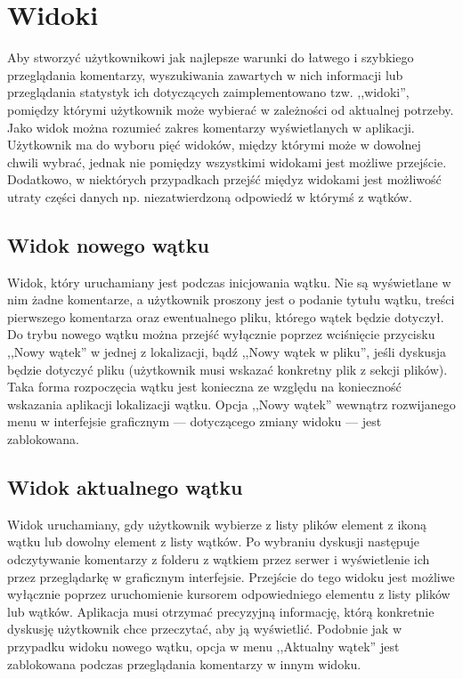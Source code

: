 \section{Widoki}

\label{views}

Aby stworzyć użytkownikowi jak najlepsze warunki do łatwego i szybkiego przeglądania komentarzy, wyszukiwania zawartych w nich informacji lub przeglądania statystyk ich dotyczących zaimplementowano tzw. ,,widoki'', pomiędzy którymi użytkownik może wybierać w zależności od aktualnej potrzeby. Jako widok można rozumieć zakres komentarzy wyświetlanych w aplikacji. Użytkownik ma do wyboru pięć widoków, między którymi może w dowolnej chwili wybrać, jednak nie pomiędzy wszystkimi widokami jest możliwe przejście. Dodatkowo, w niektórych przypadkach przejść międyz widokami jest możliwość utraty części danych np. niezatwierdzoną odpowiedź w którymś z wątków.

\subsection*{Widok nowego wątku}

Widok, który uruchamiany jest podczas inicjowania wątku. Nie są wyświetlane w nim żadne komentarze, a użytkownik proszony jest o podanie tytułu wątku, treści pierwszego komentarza oraz ewentualnego pliku, którego wątek będzie dotyczył. Do trybu nowego wątku można przejść wyłącznie poprzez wciśnięcie przycisku ,,Nowy wątek'' w jednej z lokalizacji, bądź ,,Nowy wątek w pliku'', jeśli dyskusja będzie dotyczyć pliku (użytkownik musi wskazać konkretny plik z sekcji plików). Taka forma rozpoczęcia wątku jest konieczna ze względu na konieczność wskazania aplikacji lokalizacji wątku. Opcja ,,Nowy wątek'' wewnątrz rozwijanego menu w interfejsie graficznym --- dotyczącego zmiany widoku --- jest zablokowana.

\subsection*{Widok aktualnego wątku}

Widok uruchamiany, gdy użytkownik wybierze z listy plików element z ikoną wątku lub dowolny element z listy wątków. Po wybraniu dyskusji następuje odczytywanie komentarzy z folderu z wątkiem przez serwer i wyświetlenie ich przez przeglądarkę w graficznym interfejsie. Przejście do tego widoku jest możliwe wyłącznie poprzez uruchomienie kursorem odpowiedniego elementu z listy plików lub wątków. Aplikacja musi otrzymać precyzyjną informację, którą konkretnie dyskusję użytkownik chce przeczytać, aby ją wyświetlić. Podobnie jak w przypadku widoku nowego wątku, opcja w menu ,,Aktualny wątek'' jest zablokowana podczas przeglądania komentarzy w innym widoku.
  

